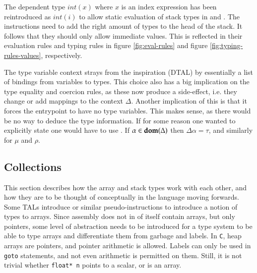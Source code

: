 The dependent type $int(x)$ where $x$ is an index expression has been
reintroduced as $int(i)$ to allow static evaluation of stack types in \incr and
\decr.
The instructions need to add the right amount of types to the head of the
stack.
It follows that they should only allow immediate values.
This is reflected in their evaluation rules and typing rules in figure
\ref{fig:eval-rules} and figure \ref{fig:typing-rules-values}, respectively.

The type variable context strays from the inspiration (DTAL) by essentially a
list of bindings from variables to types.
This choice also has a big implication on the type equality and coercion rules,
as these now produce a side-effect, i.e. they change or add mappings to the
context $\Delta$.
Another implication of this is that it forces the entrypoint to have no type
variables. This makes sense, as there would be no way to deduce the type
information. If for some reason one wanted to explicitly state 
one would have to use \ttop.
If $\alpha \in \mathbf{dom}(\Delta)$ then $\Delta{\alpha} = \tau$, and similarly for
$\mu$ and $\rho$.

\subsection{Collections}
This section describes how the array and stack types work with each other, and
how they are to be thought of conceptually in the language moving forwards.
Some TALs introduce \malloc or similar pseudo-instructions to introduce a
notion of types to arrays. Since assembly does not in of itself contain arrays,
but only pointers, some level of abstraction needs to be introduced for a type
system to be able to type arrays and differentiate them from garbage and labels.
In \texttt{C}, heap arrays are pointers, and pointer arithmetic is allowed.
Labels can only be used in \texttt{goto} statements, and not even arithmetic is
permitted on them. Still, it is not trivial whether \lstinline{float* n} points
to a scalar, or is an array.

